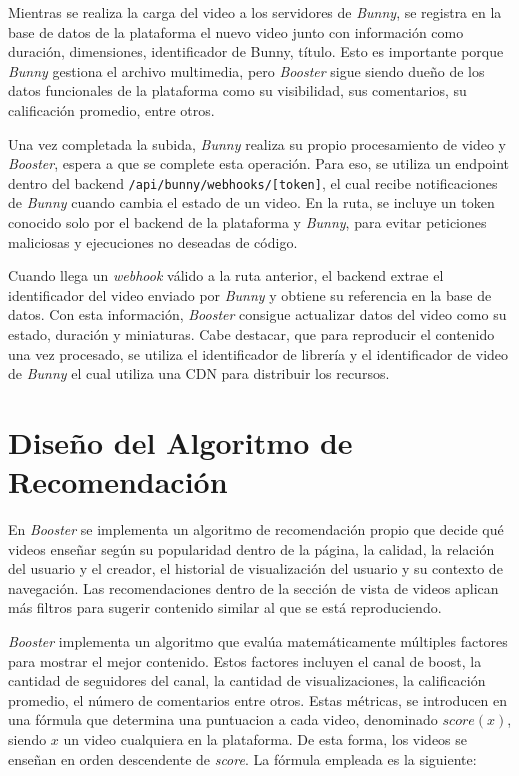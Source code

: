 Mientras se realiza la carga del video a los servidores de \textit{Bunny}, se registra en la base de datos de la plataforma el nuevo video junto con información como duración, dimensiones, identificador de Bunny, título. Esto es importante porque \textit{Bunny} gestiona el archivo multimedia, pero \textit{Booster} sigue siendo dueño de los datos funcionales de la plataforma como su visibilidad, sus comentarios, su calificación promedio, entre otros. 

Una vez completada la subida, \textit{Bunny} realiza su propio procesamiento de video y \textit{Booster}, espera a que se complete esta operación. Para eso, se utiliza un endpoint dentro del backend \texttt{/api/bunny/webhooks/[token]}, el cual recibe notificaciones de \textit{Bunny} cuando cambia el estado de un video. En la ruta, se incluye un token conocido solo por el backend de la plataforma y \textit{Bunny}, para evitar peticiones maliciosas y ejecuciones no deseadas de código. 

Cuando llega un \textit{webhook} válido a la ruta anterior, el backend extrae el identificador del video enviado por \textit{Bunny} y obtiene su referencia en la base de datos. Con esta información, \textit{Booster} consigue actualizar datos del video como su estado, duración y miniaturas. Cabe destacar, que para reproducir el contenido una vez procesado, se utiliza el identificador de librería y el identificador de video de \textit{Bunny} el cual utiliza una CDN para distribuir los recursos.  
 


\section{Diseño del Algoritmo de Recomendación}
\label{algoritmo}

En \textit{Booster} se implementa un algoritmo de recomendación propio que decide qué videos enseñar según su popularidad dentro de la página, la calidad, la relación del usuario y el creador, el historial de visualización del usuario y su contexto de navegación. Las recomendaciones dentro de la sección de vista de videos aplican más filtros para sugerir contenido similar al que se está reproduciendo. 

\textit{Booster} implementa un algoritmo que evalúa matemáticamente múltiples factores para mostrar el mejor contenido. Estos factores incluyen el canal de boost, la cantidad de seguidores del canal, la cantidad de visualizaciones, la calificación promedio, el número de comentarios entre otros. Estas métricas, se introducen en una fórmula que determina una puntuacion a cada video, denominado $score(x)$, siendo $x$ un video cualquiera en la plataforma. De esta forma, los videos se enseñan en orden descendente de \textit{score}. La fórmula empleada es la siguiente:

